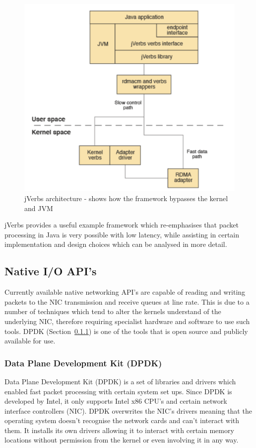 \documentclass[final_report.tex]{subfiles}
\begin{document}
\begin{figure}[H]
	\centering
	\includegraphics[width=\textwidth]{img/jverbs.png}
	\caption{jVerbs architecture - shows how the framework bypasses the kernel and JVM \cite{ibm_jverbs}}
	\label{fig:jverb}
\end{figure}

jVerbs provides a useful example framework which re-emphasises that packet processing in Java is very possible with low latency, while assisting in certain implementation and design choices which can be analysed in more detail.

\subsection{Native I/O API's}
Currently available native networking API's are capable of reading and writing packets to the NIC transmission and receive queues at line rate. This is due to a number of techniques which tend to alter the kernels understand of the underlying NIC, therefore requiring specialist hardware and software to use such tools. DPDK (Section~\ref{subsec:dpdk}) is one of the tools that is open source and publicly available for use.

\subsubsection{Data Plane Development Kit (DPDK)}
\label{subsec:dpdk}
Data Plane Development Kit (DPDK) \cite{dpdk} is a set of libraries and drivers which enabled fast packet processing with certain system set ups. Since DPDK is developed by Intel, it only supports Intel x86 CPU's and certain network interface controllers (NIC). DPDK overwrites the NIC's drivers meaning that the operating system doesn't recognise the network cards and can't interact with them. It installs its own drivers allowing it to interact with certain memory locations without permission from the kernel or even involving it in any way.
\end{document}
